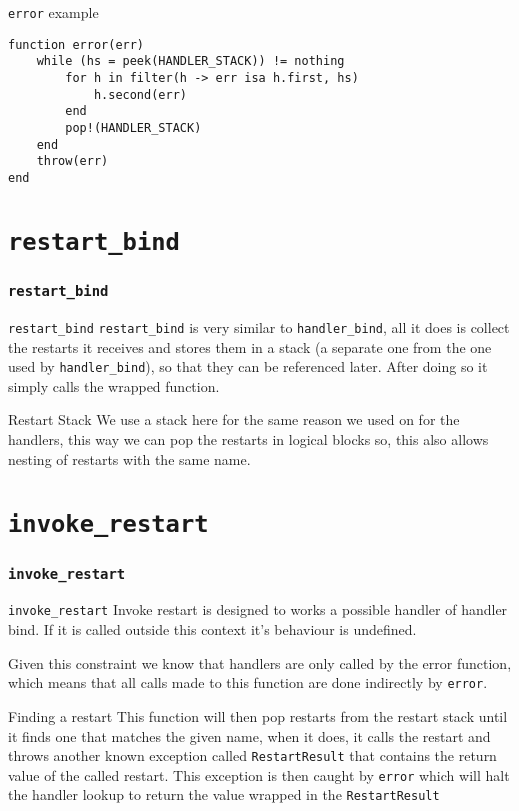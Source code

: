 \documentclass{beamer}
\begin{document}
\begin{frame}[fragile]{\texttt{error} example}
\begin{verbatim}
function error(err)
    while (hs = peek(HANDLER_STACK)) != nothing
        for h in filter(h -> err isa h.first, hs)
            h.second(err)
        end
        pop!(HANDLER_STACK)
    end
    throw(err)
end
\end{verbatim}
\end{frame}

\section{\texttt{restart\_bind}}
\begin{frame}
\frametitle{\texttt{restart\_bind}}

\begin{block}{\texttt{restart\_bind}}
\texttt{restart\_bind} is very similar to \texttt{handler\_bind}, all it does is collect
the restarts it receives and stores them in a stack (a separate one from the one used by \texttt{handler\_bind}), so
that they can be referenced later. After doing so it simply calls the wrapped function.
\end{block}

\begin{block}{Restart Stack}
We use a stack here for the same reason we used on for the handlers, this way we can pop the restarts in logical blocks
so, this also allows nesting of restarts with the same name.
\end{block}


\end{frame}


\section{\texttt{invoke\_restart}}

\begin{frame}
\frametitle{\texttt{invoke\_restart}}

\begin{block}{\texttt{invoke\_restart}}
Invoke restart is designed to works a possible handler of handler bind. If it is called outside this context
it's behaviour is undefined.

Given this constraint we know that handlers are only called by the error function, which means that all calls
made to this function are done indirectly by \texttt{error}.
\end{block}
\begin{block}{Finding a restart}
This function will then pop restarts from the restart stack until it finds one that matches the given
name, when it does, it calls the restart and throws another known exception called \texttt{RestartResult}
that contains the return value of the called restart. This exception is then caught by \texttt{error} which
will halt the handler lookup to return the value wrapped in the \texttt{RestartResult}
\end{block}


\end{frame}
\end{document}
